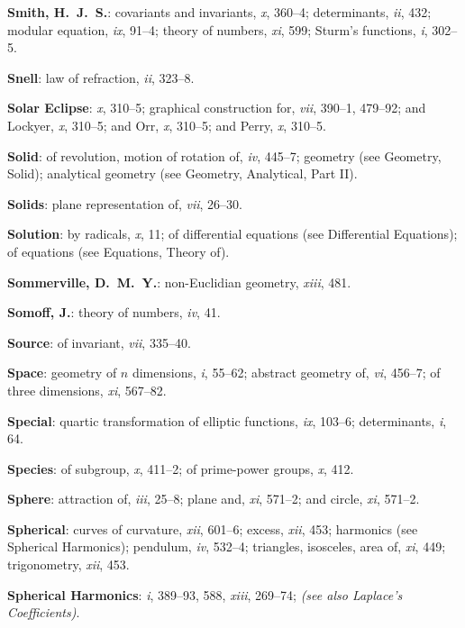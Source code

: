 \documentclass[11pt,a4paper]{article}
\newcommand{\IndexEntry}[1]{\textbf{#1}}
\newcommand{\SeeAlso}[1]{\textit{(see also #1)}}
\newcommand{\V}[1]{\textit{#1}} %
\begin{document}
\IndexEntry{Smith, H.\ J.\ S.}: covariants and invariants, \V{x}, 360--4; determinants, \V{ii}, 432; modular equation, \V{ix}, 91--4; theory of numbers, \V{xi}, 599; Sturm's functions, \V{i}, 302--5.

\IndexEntry{Snell}: law of refraction, \V{ii}, 323--8.

\IndexEntry{Solar Eclipse}: \V{x}, 310--5; graphical construction for, \V{vii}, 390--1, 479--92; and Lockyer, \V{x}, 310--5; and Orr, \V{x}, 310--5; and Perry, \V{x}, 310--5.

\IndexEntry{Solid}: of revolution, motion of rotation of, \V{iv}, 445--7; geometry (see Geometry, Solid); analytical geometry (see Geometry, Analytical, Part II).

\IndexEntry{Solids}: plane representation of, \V{vii}, 26--30.

\IndexEntry{Solution}: by radicals, \V{x}, 11; of differential equations (see Differential Equations); of equations (see Equations, Theory of).

\IndexEntry{Sommerville, D.\ M.\ Y.}: non-Euclidian geometry, \V{xiii}, 481.

\IndexEntry{Somoff, J.}: theory of numbers, \V{iv}, 41.

\IndexEntry{Source}: of invariant, \V{vii}, 335--40.

\IndexEntry{Space}: geometry of $n$ dimensions, \V{i}, 55--62; abstract geometry of, \V{vi}, 456--7; of three dimensions, \V{xi}, 567--82.

\newpage

\setcounter{page}{124}

\IndexEntry{Special}: quartic transformation of elliptic functions, \V{ix}, 103--6; determinants, \V{i}, 64.

\IndexEntry{Species}: of subgroup, \V{x}, 411--2; of prime-power groups, \V{x}, 412.

\IndexEntry{Sphere}: attraction of, \V{iii}, 25--8; plane and, \V{xi}, 571--2; and circle, \V{xi}, 571--2.

\IndexEntry{Spherical}: curves of curvature, \V{xii}, 601--6; excess, \V{xii}, 453; harmonics (see Spherical Harmonics); pendulum, \V{iv}, 532--4; triangles, isosceles, area of, \V{xi}, 449; trigonometry, \V{xii}, 453.

\IndexEntry{Spherical Harmonics}: \V{i}, 389--93, 588, \V{xiii}, 269--74; \SeeAlso{Laplace's Coefficients}.
\end{document}
